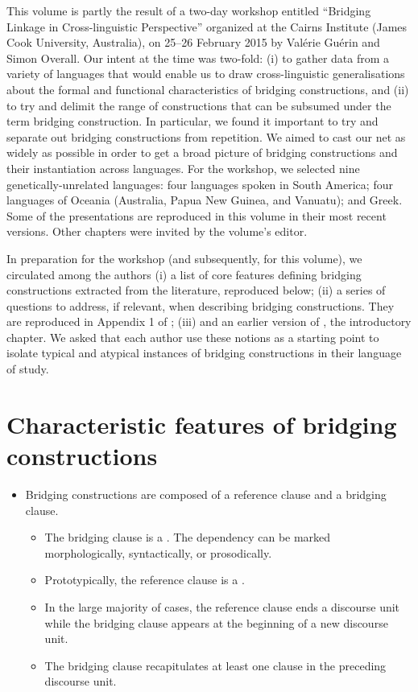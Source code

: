 \begin{refsection}


This volume is partly the result of a two-day workshop entitled ``Bridging Linkage in Cross-linguistic Perspective'' organized at the Cairns Institute (James Cook University, Australia), on 25--26 February 2015 by Valérie Guérin and Simon Overall. Our intent at the time was two-fold: (i) to gather data from a variety of languages that would enable us to draw cross-linguistic generalisations about the formal and functional characteristics of bridging constructions, and (ii) to try and delimit the range of constructions that can be subsumed under the term bridging construction. In particular, we found it important to try and separate out bridging constructions from repetition. We aimed to cast our net as widely as possible in order to get a broad picture of bridging constructions and their instantiation across languages. For the workshop, we selected  nine genetically-unrelated languages: four languages spoken in South America; four languages of Oceania (Australia, Papua New Guinea, and Vanuatu); and Greek. Some of the presentations are reproduced in this volume in their most recent versions. Other chapters were invited by the volume’s editor. 

In preparation for the workshop (and subsequently, for this volume), we circulated among the authors (i) a list of core features defining bridging constructions extracted from the literature, reproduced below; (ii) a series of questions to address, if relevant, when describing bridging constructions. They are reproduced in Appendix 1 of ; (iii) and an earlier version of , the introductory chapter. We asked that each author use these notions as a starting point to isolate typical and atypical instances of bridging constructions in their language of study. 



\section*{Characteristic features of bridging constructions}


\begin{itemize}
\item Bridging constructions are composed of a reference clause and a bridging clause. 
   \begin{itemize}
   \item The bridging clause is a . The dependency can be marked morphologically, syntactically, or prosodically.
   \item  Prototypically, the reference clause is a . 
   \item In the large majority of cases, the reference clause ends a discourse unit while the bridging clause appears at the beginning of a new discourse unit.
   \item  The bridging clause recapitulates at least one clause in the preceding discourse unit. 
   \end{itemize}
   \end{itemize}
   

\end{refsection}

